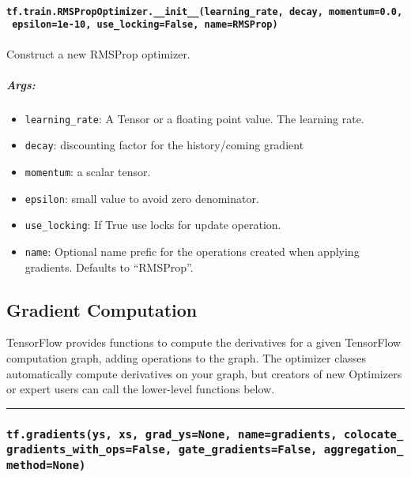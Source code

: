 \paragraph{\texorpdfstring{\texttt{tf.train.RMSPropOptimizer.\_\_init\_\_(learning\_rate,\ decay,\ momentum=0.0,\ epsilon=1e-10,\ use\_locking=False,\ name=\textquotesingle{}RMSProp\textquotesingle{})}
}{tf.train.RMSPropOptimizer.\_\_init\_\_(learning\_rate, decay, momentum=0.0, epsilon=1e-10, use\_locking=False, name='RMSProp') }}\label{tf.train.rmspropoptimizer.ux5fux5finitux5fux5flearningux5frate-decay-momentum0.0-epsilon1e-10-useux5flockingfalse-namermsprop}

Construct a new RMSProp optimizer.

\subparagraph{Args: }\label{args-10}

\begin{itemize}
\tightlist
\item
  \texttt{learning\_rate}: A Tensor or a floating point value. The
  learning rate.
\item
  \texttt{decay}: discounting factor for the history/coming gradient
\item
  \texttt{momentum}: a scalar tensor.
\item
  \texttt{epsilon}: small value to avoid zero denominator.
\item
  \texttt{use\_locking}: If True use locks for update operation.
\item
  \texttt{name}: Optional name prefic for the operations created when
  applying gradients. Defaults to ``RMSProp''.
\end{itemize}

\subsection{Gradient Computation }\label{gradient-computation}

TensorFlow provides functions to compute the derivatives for a given
TensorFlow computation graph, adding operations to the graph. The
optimizer classes automatically compute derivatives on your graph, but
creators of new Optimizers or expert users can call the lower-level
functions below.

\begin{center}\rule{0.5\linewidth}{\linethickness}\end{center}

\subsubsection{\texorpdfstring{\texttt{tf.gradients(ys,\ xs,\ grad\_ys=None,\ name=\textquotesingle{}gradients\textquotesingle{},\ colocate\_gradients\_with\_ops=False,\ gate\_gradients=False,\ aggregation\_method=None)}
}{tf.gradients(ys, xs, grad\_ys=None, name='gradients', colocate\_gradients\_with\_ops=False, gate\_gradients=False, aggregation\_method=None) }}\label{tf.gradientsys-xs-gradux5fysnone-namegradients-colocateux5fgradientsux5fwithux5fopsfalse-gateux5fgradientsfalse-aggregationux5fmethodnone}

